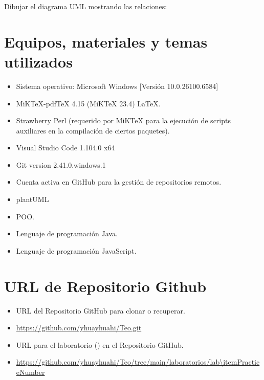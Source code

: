 Dibujar el diagrama UML mostrando las relaciones:




\section{Equipos, materiales y temas utilizados}

\begin{itemize}
    \item Sistema operativo: Microsoft Windows [Versión 10.0.26100.6584]
    \item MiKTeX-pdfTeX 4.15 (MiKTeX 23.4) \LaTeX.
    \item Strawberry Perl (requerido por MiKTeX para la ejecución de scripts auxiliares en la compilación de ciertos paquetes).
    \item Visual Studio Code 1.104.0 x64
    \item Git version 2.41.0.windows.1
    \item Cuenta activa en GitHub para la gestión de repositorios remotos.
    \item plantUML
    \item POO.
    \item Lenguaje de programación Java.
    \item Lenguaje de programación JavaScript.
\end{itemize}




\section{URL de Repositorio Github}

\begin{itemize}
    \item URL del Repositorio GitHub para clonar o recuperar.
    \item \url{https://github.com/yhuayhuahi/Teo.git}
    \item URL para el laboratorio (\itemPracticeNumber) en el Repositorio GitHub.
    \item \url{https://github.com/yhuayhuahi/Teo/tree/main/laboratorios/lab\itemPracticeNumber}
\end{itemize}




